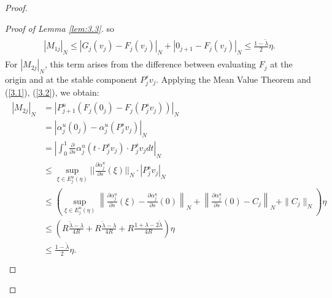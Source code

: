 \documentclass[12pt]{article}
\begin{document}
\begin{proof}
\begin{proof}[Proof of Lemma \ref{lem:3.3}]
		so
		\begin{align} \label{3.11}
			\begin{split}
				|M_{1j}|_{N}\leqslant|G_{j}(v_{j})-F_{j}(v_{j})|_{N}+|0_{j+1}-F_{j}(v_{j})|_{N}\leqslant\frac{1-\widetilde\lambda}{2}\eta.
			\end{split}
		\end{align}
		For $ |M_{2j}|_{N} $, this term arises from the difference between evaluating $ F_{j} $ at the origin and at the stable component $ P_{j}^{s}v_{j} $. Applying the Mean Value Theorem and (\ref{3.1}), (\ref{3.2}), we obtain:
		\begin{align} \label{3.12}
			\begin{split}
				|M_{2j}|_{N}
				&=|P_{j+1}^{u}(F_{j}(0_{j})-F_{j}(P_{j}^{s}v_{j}))|_{N}\\
				&=|\alpha_{j}^{u}(0_{j})-\alpha_{j}^{u}(P_{j}^{s}v_{j})|_{N}\\
				&=|\int_{0}^{1}\frac{\partial}{\partial s}\alpha_{j}^{u}(t\cdot P_{j}^{s}v_{j}) \cdot P_{j}^{s}v_{j}dt|_{N}\\
				&\leqslant \underset{\xi\in E_{j}^{u}(\eta) }{\sup}||\frac{\partial\alpha_{j}^{u}}{\partial s}(\xi)||_{N}\cdot |P_{j}^{s}v_{j}|_{N} \\
				&\leqslant   \left(\sup\limits_{\xi\in E^u_{j}(\eta)}
				\left\|\frac{\partial \alpha_j^u}{\partial s}(\xi) -\frac{\partial \alpha_j^u}{\partial s}(0) \right\|_{N}+ \left\|\frac{\partial \alpha_j^u}{\partial s}(0) -C_{j} \right\|_{N} +\|C_{j} \|_{N}\right) \eta\\
				&\leqslant (R\frac{\widetilde\lambda-\lambda}{4R}+R\frac{\widetilde\lambda-\lambda}{4R}  + R\frac{1+\lambda-2\widetilde\lambda}{4R}) \eta  \\
				&\leqslant \frac{1-\widetilde\lambda}{2} \eta.\\
			\end{split}
		\end{align}
		

\end{proof}
\end{proof}
\end{document}
